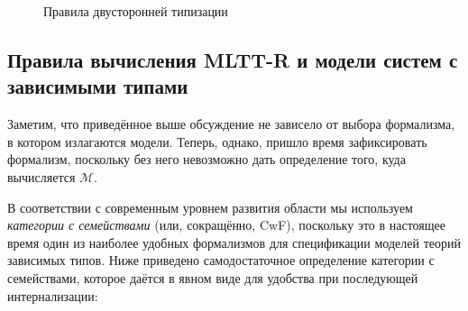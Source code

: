\begin{figure}
    \caption{Правила двусторонней типизации}
    \label{mltt-r-typing}
\end{figure}

\subsection
{Правила вычисления MLTT-R и
модели систем с зависимыми типами}

Заметим, что приведённое выше обсуждение не зависело от
выбора формализма, в котором излагаются модели. Теперь,
однако, пришло время зафиксировать формализм, поскольку
без него невозможно дать определение того, куда
вычисляется $\mathcal{M}$.

В соответствии с современным уровнем развития области
мы используем \emph{категории с семействами}
\cite{castellan2020cwf} (или, сокращённо, CwF),
поскольку это в настоящее время один из наиболее
удобных формализмов для спецификации моделей теорий
зависимых типов. Ниже приведено самодостаточное
определение категории с семействами, которое даётся в
явном виде для удобства при последующей интернализации:

